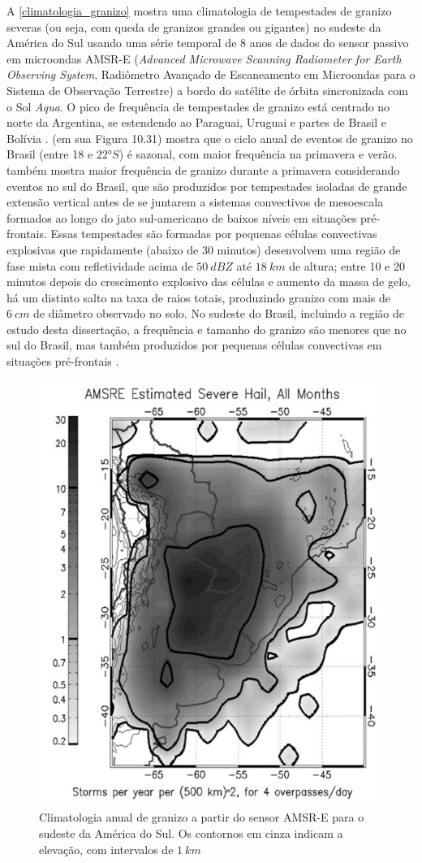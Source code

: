 A \autoref{climatologia_granizo} mostra uma climatologia de tempestades de granizo severas (ou seja, com queda de granizos grandes ou gigantes) no sudeste da América do Sul usando uma série temporal de 8 anos de dados do sensor passivo em microondas AMSR-E (\textit{Advanced Microwave Scanning Radiometer for Earth Observing System}, Radiômetro Avançado de Escaneamento em Microondas para o Sistema de Observação Terrestre) a bordo do satélite de órbita sincronizada com o Sol \textit{Aqua}. O pico de frequência de tempestades de granizo está centrado no norte da Argentina, se estendendo ao Paraguai, Uruguai e partes de Brasil e Bolívia \cite{Cecil2012a}.  (em sua Figura 10.31) mostra que o ciclo anual de eventos de granizo no Brasil (entre 18 e $\ang{22}S$) é sazonal, com maior frequência na primavera e verão.  também mostra maior frequência de granizo durante a primavera considerando eventos no sul do Brasil, que são produzidos por tempestades isoladas de grande extensão vertical antes de se juntarem a sistemas convectivos de mesoescala formados ao longo do jato sul-americano de baixos níveis em situações pré-frontais. Essas tempestades são formadas por pequenas células convectivas explosivas que rapidamente (abaixo de 30 minutos) desenvolvem uma região de fase mista com refletividade acima de $50\:dBZ$ até $18\:km$ de altura; entre 10 e 20 minutos depois do crescimento explosivo das células e aumento da massa de gelo, há um distinto salto na taxa de raios totais, produzindo granizo com mais de $6\:cm$ de diâmetro observado no solo. No sudeste do Brasil, incluindo a região de estudo desta dissertação, a frequência e tamanho do granizo são menores que no sul do Brasil, mas também produzidos por pequenas células convectivas em situações pré-frontais \cite{Puig2017}.

\begin{figure}[htb]
	\begin{center}
		\caption{Climatologia anual de granizo a partir do sensor AMSR-E para o sudeste da América do Sul. Os contornos em cinza indicam a elevação, com intervalos de $1\:km$} 
		\label{climatologia_granizo}
		\includegraphics[width=0.5\columnwidth]{figs/cecil_severehail.png}
	\end{center}
\end{figure}

